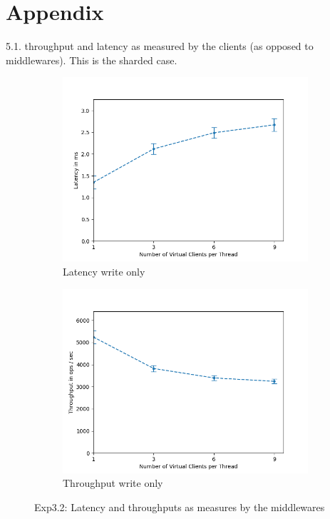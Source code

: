 \documentclass[11pt,a4paper]{article}
\begin{document}
\section{Appendix}

5.1. throughput and latency as measured by the clients (as opposed to middlewares).
This is the sharded case.

\begin{figure}[H]
\centering
\begin{subfigure}{.5\textwidth}
    \centering
    \includegraphics[width=\textwidth]{img/exp5_1/exp5_1__mw_latency_sharding_True.png}
    \caption{Latency write only}
    \label{fig:mesh1}
\end{subfigure}%
\begin{subfigure}{.5\textwidth}
      \centering
    \includegraphics[width=\textwidth]{img/exp5_1/exp5_1__mw_throughput_sharding_True.png}
    \caption{Throughput write only}
    \label{fig:mesh1}
\end{subfigure}
\caption{Exp3.2: Latency and throughputs as measures by the middlewares}
\label{fig:test}
\end{figure}
\end{document}
